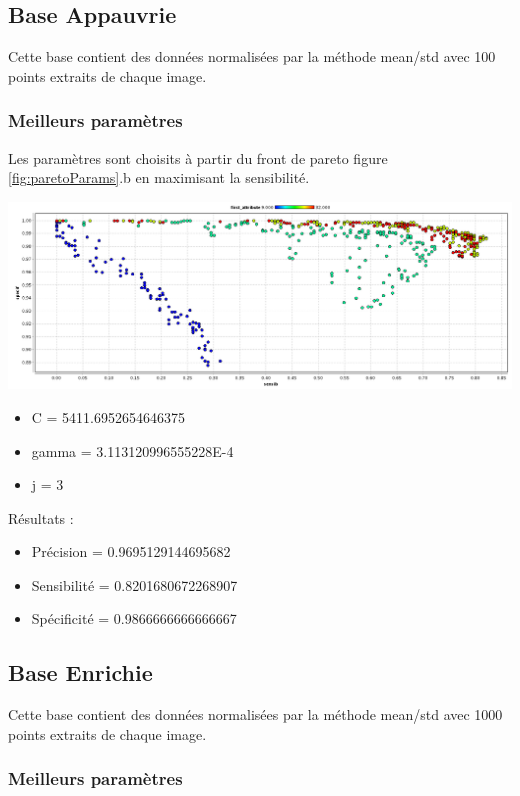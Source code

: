 \subsection{Base Appauvrie}

Cette base contient des données normalisées par la méthode mean/std avec 100 points extraits de chaque image.

\subsubsection{Meilleurs paramètres}

Les paramètres sont choisits à partir du front de pareto figure \ref{fig:paretoParams}.b en maximisant la sensibilité.

\includegraphics[width=14cm]{images/pareto_param_100.png}

\begin{itemize}
\item C = 5411.6952654646375
\item gamma = 3.113120996555228E-4
\item j = 3
\end{itemize}

Résultats :

\begin{itemize}
\item Précision = 0.9695129144695682
\item Sensibilité = 0.8201680672268907
\item Spécificité = 0.9866666666666667
\end{itemize}




\subsection{Base Enrichie}

Cette base contient des données normalisées par la méthode mean/std avec 1000 points extraits de chaque image.

\subsubsection{Meilleurs paramètres}

